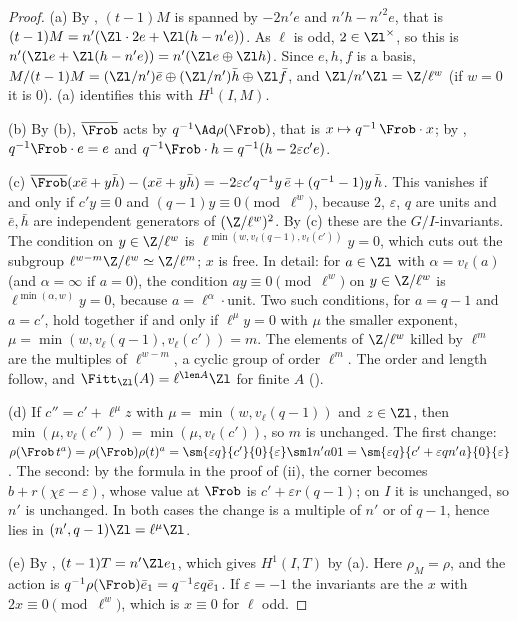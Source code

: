 \begin{proof}
(a) By , $(t-1)M$ is spanned by $-2n'e$ and $n'h-n'^2e$, that is $(t-1)M=n'(\Zl\cdot2e+\Zl(h-n'e))$. As $\ell$ is odd, $2\in\Zl^\times$, so this
is $n'(\Zl e+\Zl(h-n'e))=n'(\Zl e\oplus\Zl h)$. Since $e,h,f$ is a basis, $M/(t-1)M=(\Zl/n')\bar e\oplus(\Zl/n')\bar h\oplus\Zl\bar f$, and $\Zl/n'\Zl=\Z/\ell^w$ (if $w=0$ it is $0$).
(a) identifies this with $H^1(I,M)$.

(b) By (b), $\overline\Frob$ acts by $q^{-1}\Ad\rho(\Frob)$, that is $x\mapsto q^{-1}\,\Frob\cdot x$; by , $q^{-1}\Frob\cdot e=e$ and $q^{-1}\Frob\cdot h=q^{-1}(h-2\varepsilon c'e)$.

(c) $\overline\Frob(x\bar e+y\bar h)-(x\bar e+y\bar h)=-2\varepsilon c'q^{-1}y\,\bar e+(q^{-1}-1)y\,\bar h$. This vanishes if and only if $c'y\equiv0$ and $(q-1)y\equiv0\pmod{\ell^w}$, because
$2$, $\varepsilon$, $q$ are units and $\bar e,\bar h$ are independent generators of $(\Z/\ell^w)^2$. By (c) these are the $G/I$-invariants. The
condition on $y\in\Z/\ell^w$ is $\ell^{\min(w,v_\ell(q-1),v_\ell(c'))}y=0$, which cuts out the subgroup $\ell^{w-m}\Z/\ell^w\simeq\Z/\ell^m$; $x$ is free. In detail: for
$a\in\Zl$ with $\alpha=v_\ell(a)$ (and $\alpha=\infty$ if $a=0$), the condition $ay\equiv0\pmod{\ell^w}$ on $y\in\Z/\ell^w$ is $\ell^{\min(\alpha,w)}y=0$, because $a=\ell^\alpha\cdot$unit. Two
such conditions, for $a=q-1$ and $a=c'$, hold together if and only if $\ell^{\mu}y=0$ with $\mu$ the smaller exponent, $\mu=\min(w,v_\ell(q-1),v_\ell(c'))=m$. The
elements of $\Z/\ell^w$ killed by $\ell^m$ are the multiples of $\ell^{w-m}$, a cyclic group of order $\ell^m$. The order and length follow,
and $\Fitt_{\Zl}(A)=\ell^{\len A}\Zl$ for finite $A$ ().

(d) If $c''=c'+\ell^\mu z$ with $\mu=\min(w,v_\ell(q-1))$ and $z\in\Zl$, then $\min(\mu,v_\ell(c''))=\min(\mu,v_\ell(c'))$, so $m$ is unchanged. The first change:
$\rho(\Frob\,t^a)=\rho(\Frob)\rho(t)^a=\sm{\varepsilon q}{c'}{0}{\varepsilon}\sm1{n'a}01=\sm{\varepsilon q}{c'+\varepsilon qn'a}{0}{\varepsilon}$. The second: by the formula in the proof of
(ii), the corner becomes $b+r(\chi\varepsilon-\varepsilon)$, whose value at $\Frob$ is $c'+\varepsilon r(q-1)$; on $I$ it is unchanged, so $n'$ is unchanged.
In both cases the change is a multiple of $n'$ or of $q-1$, hence lies in $(n',q-1)\Zl=\ell^\mu\Zl$.

(e) By , $(t-1)T=n'\Zl e_1$, which gives $H^1(I,T)$ by (a). Here $\rho_M=\rho$, and the action is $q^{-1}\rho(\Frob)\bar e_1=q^{-1}\varepsilon q\bar e_1$.
If $\varepsilon=-1$ the invariants are the $x$ with $2x\equiv0\pmod{\ell^w}$, which is $x\equiv0$ for $\ell$ odd.
\end{proof}

